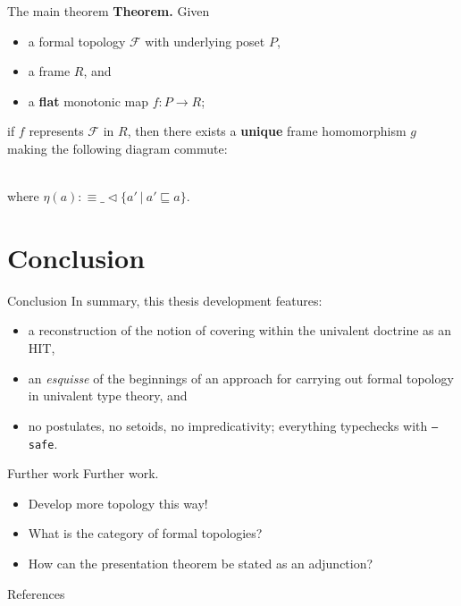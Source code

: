 \documentclass[xcolor={dvipsnames}]{beamer}
\newcommand{\fix}[2]{\mathfrak{fix}\left(#1, #2\right)}
\newcommand{\McF}{\mathcal{F}}
\newcommand{\is}{:\equiv}
\newcommand{\covers}[2]{#1 \lhd #2}
\begin{document}
\begin{frame}[fragile]{The main theorem}
  \textbf{Theorem.} Given
  \begin{itemize}
    \item a formal topology $\McF{}$ with underlying poset $P$,
    \item a frame $R$, and
    \item a \textbf{flat} monotonic map $f : P \rightarrow R$;
  \end{itemize}
  \begin{center}
    if $f$ represents $\McF{}$ in $R$, then there exists a \textbf{unique} frame
    homomorphism $g$ making the following diagram commute:
  \end{center}

  \begin{center}
    \\
    \vspace{0.5em}
    {\footnotesize where $\eta(a) \is \covers{\_}{ \{ a' ~|~ a' \sqsubseteq a \} }$.}
  \end{center}
\end{frame}

\section{Conclusion}

\begin{frame}[noframenumbering]{Conclusion}
  In summary, this thesis development features:
  \begin{itemize}
    \item a reconstruction of the notion of covering within the univalent doctrine as an
      HIT,
    \item an \emph{esquisse} of the beginnings of an approach for carrying out formal
      topology in univalent type theory, and
    \item no postulates, no setoids, no impredicativity; everything typechecks with
      {\small \texttt{--safe}}.
  \end{itemize}
\end{frame}

\begin{frame}[noframenumbering]{Further work}
  Further work.
  \begin{itemize}
    \item Develop more topology this way!
    \item What is the category of formal topologies?
    \item How can the presentation theorem be stated as an adjunction?
  \end{itemize}
\end{frame}

\begin{frame}[noframenumbering]{References}
  \printbibliography[heading=none]
\end{frame}
\end{document}

